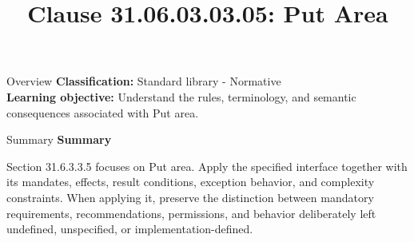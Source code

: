 \documentclass[10pt,letterpaper]{article}
\title{Clause 31.06.03.03.05: Put Area}
\author{}
\date{}
\begin{document}
\maketitle
\begin{CornellOverviewBox}{Overview}
\textbf{Classification:} Standard library - Normative\\[2pt]
\textbf{Learning objective:} Understand the rules, terminology, and semantic consequences associated with Put area.
\end{CornellOverviewBox}\begin{CornellSummaryBox}{Summary}
{\sffamily\bfseries\color{Accent} Summary}\par\vspace{3pt}Section 31.6.3.3.5 focuses on Put area. Apply the specified interface together with its mandates, effects, result conditions, exception behavior, and complexity constraints. When applying it, preserve the distinction between mandatory requirements, recommendations, permissions, and behavior deliberately left undefined, unspecified, or implementation-defined.
\end{CornellSummaryBox}
\end{document}
